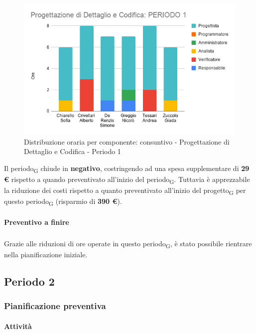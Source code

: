 \begin{figure}[H]
	\centering
	\includegraphics[scale=0.6]{res/images/charts/consuntivo/prog_dett_1.png}
	\caption{Distribuzione oraria per componente: consuntivo - Progettazione di Dettaglio e Codifica - Periodo 1}
\end{figure}


Il periodo\textsubscript{G} chiude in \textbf{negativo}, costringendo ad una spesa supplementare di \textbf{29 \euro} rispetto a quando preventivato all'inizio del periodo\textsubscript{G}. Tuttavia è apprezzabile la riduzione dei costi rispetto a quanto preventivato all'inizio del progetto\textsubscript{G} per questo periodo\textsubscript{G} (risparmio di \textbf{390 \euro}).


\paragraph{Preventivo a finire}
\subparagraph*{}

\pafTable{
	
}

Grazie alle riduzioni di ore operate in questo periodo\textsubscript{G}, è stato possibile rientrare nella pianificazione iniziale.


\pagebreak
\subsection{Periodo 2}

\subsubsection{Pianificazione preventiva}

\paragraph{Attività}
\subparagraph*{}

